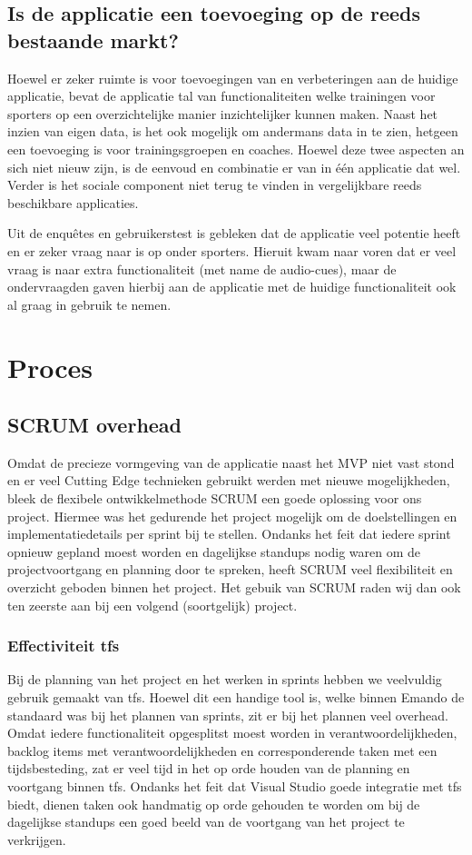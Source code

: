 \subsection{Is de applicatie een toevoeging op de reeds bestaande markt?}
Hoewel er zeker ruimte is voor toevoegingen van en verbeteringen aan de huidige applicatie, bevat de applicatie tal van functionaliteiten welke trainingen voor sporters op een overzichtelijke manier inzichtelijker kunnen maken. Naast het inzien van eigen data, is het ook mogelijk om andermans data in te zien, hetgeen een toevoeging is voor trainingsgroepen en coaches. 
Hoewel deze twee aspecten an sich niet nieuw zijn, is de eenvoud en combinatie er van in één applicatie dat wel. Verder is het sociale component niet terug te vinden in vergelijkbare reeds beschikbare applicaties.

Uit de enquêtes en gebruikerstest is gebleken dat de applicatie veel potentie heeft en er zeker vraag naar is op onder sporters. Hieruit kwam naar voren dat er veel vraag is naar extra functionaliteit (met name de audio-cues), maar de ondervraagden gaven hierbij aan de applicatie met de huidige functionaliteit ook al graag in gebruik te nemen.

\section{Proces}

\subsection{SCRUM overhead}
Omdat de precieze vormgeving van de applicatie naast het MVP niet vast stond en er veel Cutting Edge technieken gebruikt werden met nieuwe mogelijkheden, bleek de flexibele ontwikkelmethode SCRUM een goede oplossing voor ons project. Hiermee was het gedurende het project mogelijk om de doelstellingen en implementatiedetails per sprint bij te stellen. Ondanks het feit dat iedere sprint opnieuw gepland moest worden en dagelijkse standups nodig waren om de projectvoortgang en planning door te spreken, heeft SCRUM veel flexibiliteit en overzicht geboden binnen het project. Het gebuik van SCRUM raden wij dan ook ten zeerste aan bij een volgend (soortgelijk) project.

\subsubsection{Effectiviteit \ac{tfs}}
Bij de planning van het project en het werken in sprints hebben we veelvuldig gebruik gemaakt van \ac{tfs}. Hoewel dit een handige tool is, welke binnen Emando de standaard was bij het plannen van sprints, zit er bij het plannen veel overhead. Omdat iedere functionaliteit opgesplitst moest worden in verantwoordelijkheden, backlog items met verantwoordelijkheden en corresponderende taken met een tijdsbesteding, zat er veel tijd in het op orde houden van de planning en voortgang binnen \ac{tfs}. Ondanks het feit dat Visual Studio goede integratie met \ac{tfs} biedt, dienen taken ook handmatig op orde gehouden te worden om bij de dagelijkse standups een goed beeld van de voortgang van het project te verkrijgen.

